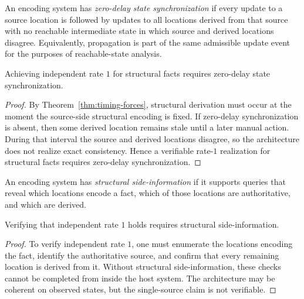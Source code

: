\begin{definition}\label{def:causal-propagation}
An encoding system has \emph{zero-delay state synchronization} if every update to a source location is followed by updates to all locations derived from that source with no reachable intermediate state in which source and derived locations disagree. Equivalently, propagation is part of the same admissible update event for the purposes of reachable-state analysis.
\end{definition}

\begin{theorem}\label{thm:causal-necessary}
Achieving independent rate $1$ for structural facts requires zero-delay state synchronization.
\end{theorem}

\begin{proof}
By Theorem~\ref{thm:timing-forces}, structural derivation must occur at the moment the source-side structural encoding is fixed. If zero-delay synchronization is absent, then some derived location remains stale until a later manual action. During that interval the source and derived locations disagree, so the architecture does not realize exact consistency. Hence a verifiable rate-$1$ realization for structural facts requires zero-delay synchronization.
\end{proof}

\begin{definition}\label{def:provenance-observability}
An encoding system has \emph{structural side-information} if it supports queries that reveal which locations encode a fact, which of those locations are authoritative, and which are derived.
\end{definition}

\begin{theorem}\label{thm:provenance-necessary}
Verifying that independent rate $1$ holds requires structural side-information.
\end{theorem}

\begin{proof}
To verify independent rate $1$, one must enumerate the locations encoding the fact, identify the authoritative source, and confirm that every remaining location is derived from it. Without structural side-information, these checks cannot be completed from inside the host system. The architecture may be coherent on observed states, but the single-source claim is not verifiable.
\end{proof}

